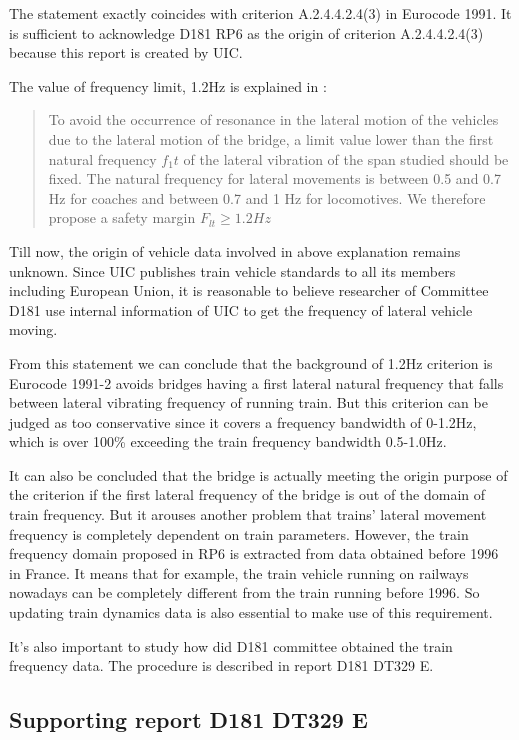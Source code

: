 The statement exactly coincides with criterion A.2.4.4.2.4(3) in Eurocode 1991. It is sufficient to acknowledge D181 RP6 as the origin of criterion A.2.4.4.2.4(3) because this report is created by UIC.

The value of frequency limit, 1.2Hz is explained in \cite[p3.2: Criterion 2]{d181}:

\begin{quote}
To avoid the occurrence of resonance in the lateral motion of the vehicles due to the lateral motion of the bridge, a limit value lower than the first natural frequency $f_1t$ of the lateral vibration of the span studied should be fixed. The natural frequency for lateral movements is between 0.5 and 0.7 Hz for coaches and between 0.7 and 1 Hz for locomotives. We therefore propose a safety margin $F_{lt} \geq 1.2Hz$
\end{quote}

Till now, the origin of vehicle data involved in above explanation remains unknown. Since UIC publishes train vehicle standards to all its members including European Union, it is reasonable to believe researcher of Committee D181 use internal information of UIC to get the frequency of lateral vehicle moving.

From this statement we can conclude that the background of 1.2Hz criterion is Eurocode 1991-2 avoids bridges having a first lateral natural frequency that falls between lateral vibrating frequency of running train. But this criterion can be judged as too conservative since it covers a frequency bandwidth of 0-1.2Hz, which is over 100\% exceeding the train frequency bandwidth 0.5-1.0Hz.

It can also be concluded that the bridge is actually meeting the origin purpose of the criterion if the first lateral frequency of the bridge is out of the domain of train frequency. But it arouses another problem that trains' lateral movement frequency is completely dependent on train parameters. However, the train frequency domain proposed in RP6 is extracted from data obtained before 1996 in France. It means that for example, the train vehicle running on railways nowadays can be completely different from the train running before 1996. So updating train dynamics data is also essential to make use of this requirement.

It's also important to study how did D181 committee obtained the train frequency data. The procedure is described in report D181 DT329 E\cite{d181dt329}. 

\subsection{Supporting report D181 DT329 E}

